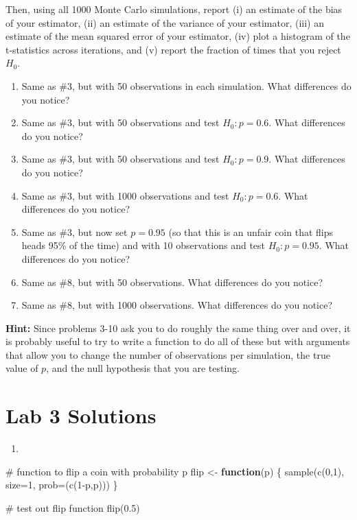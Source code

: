 \documentclass[
  letterpaper,
  DIV=11,
  numbers=noendperiod]{scrreprt}
\newenvironment{Shaded}{\begin{snugshade}}{\end{snugshade}}
\newcommand{\AttributeTok}[1]{\textcolor[rgb]{0.40,0.45,0.13}{#1}}
\newcommand{\CommentTok}[1]{\textcolor[rgb]{0.37,0.37,0.37}{#1}}
\newcommand{\ControlFlowTok}[1]{\textcolor[rgb]{0.00,0.23,0.31}{\textbf{#1}}}
\newcommand{\DecValTok}[1]{\textcolor[rgb]{0.68,0.00,0.00}{#1}}
\newcommand{\FloatTok}[1]{\textcolor[rgb]{0.68,0.00,0.00}{#1}}
\newcommand{\FunctionTok}[1]{\textcolor[rgb]{0.28,0.35,0.67}{#1}}
\newcommand{\NormalTok}[1]{\textcolor[rgb]{0.00,0.23,0.31}{#1}}
\newcommand{\OtherTok}[1]{\textcolor[rgb]{0.00,0.23,0.31}{#1}}
\newcommand{\SpecialCharTok}[1]{\textcolor[rgb]{0.37,0.37,0.37}{#1}}
\providecommand{\tightlist}{%
  \setlength{\itemsep}{0pt}\setlength{\parskip}{0pt}}\usepackage{longtable,booktabs,array}
\begin{document}
Then, using all 1000 Monte Carlo simulations, report (i) an estimate of
the bias of your estimator, (ii) an estimate of the variance of your
estimator, (iii) an estimate of the mean squared error of your
estimator, (iv) plot a histogram of the t-statistics across iterations,
and (v) report the fraction of times that you reject \(H_0\).

\begin{enumerate}
\def\labelenumi{\arabic{enumi}.}
\setcounter{enumi}{3}
\item
  Same as \#3, but with 50 observations in each simulation. What
  differences do you notice?
\item
  Same as \#3, but with 50 observations and test \(H_0:p=0.6\). What
  differences do you notice?
\item
  Same as \#3, but with 50 observations and test \(H_0:p=0.9\). What
  differences do you notice?
\item
  Same as \#3, but with 1000 observations and test \(H_0:p=0.6\). What
  differences do you notice?
\item
  Same as \#3, but now set \(p=0.95\) (so that this is an unfair coin
  that flips heads 95\% of the time) and with 10 observations and test
  \(H_0:p=0.95\). What differences do you notice?
\item
  Same as \#8, but with 50 observations. What differences do you notice?
\item
  Same as \#8, but with 1000 observations. What differences do you
  notice?
\end{enumerate}

\textbf{Hint:} Since problems 3-10 ask you to do roughly the same thing
over and over, it is probably useful to try to write a function to do
all of these but with arguments that allow you to change the number of
observations per simulation, the true value of \(p\), and the null
hypothesis that you are testing.

\section{Lab 3 Solutions}\label{lab-3-solutions}

\begin{enumerate}
\def\labelenumi{\arabic{enumi}.}
\tightlist
\item
\end{enumerate}

\begin{Shaded}
\begin{Highlighting}[]
\CommentTok{\# function to flip a coin with probability p}
\NormalTok{flip }\OtherTok{\textless{}{-}} \ControlFlowTok{function}\NormalTok{(p) \{}
  \FunctionTok{sample}\NormalTok{(}\FunctionTok{c}\NormalTok{(}\DecValTok{0}\NormalTok{,}\DecValTok{1}\NormalTok{), }\AttributeTok{size=}\DecValTok{1}\NormalTok{, }\AttributeTok{prob=}\NormalTok{(}\FunctionTok{c}\NormalTok{(}\DecValTok{1}\SpecialCharTok{{-}}\NormalTok{p,p)))}
\NormalTok{\}}

\CommentTok{\# test out flip function}
\FunctionTok{flip}\NormalTok{(}\FloatTok{0.5}\NormalTok{)}
\end{Highlighting}
\end{Shaded}
\end{document}
